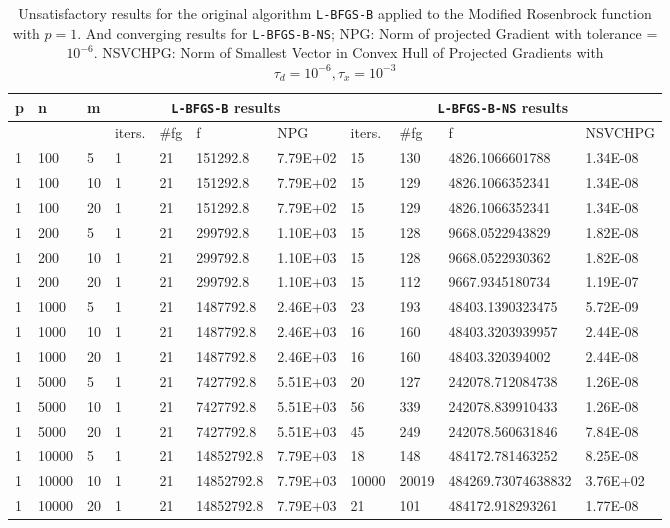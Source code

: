 \begin{table}
  \scriptsize
  \begin{center}
    \begin{tabular}{|l|l|l|l|l|l|l|l|l|l|l|}
      \hline
      p  &  n  &  m  & \multicolumn{4}{|c|}{\texttt{L-BFGS-B} results} & \multicolumn{4}{|c|}{\texttt{L-BFGS-B-NS} results} \\ \hline
      & &  & iters. & \#fg & f & NPG & iters. & \#fg & f & NSVCHPG \\ \hline
      1 & 100 & 5  & 1 & 21 & 151292.8 & 7.79E+02 & 15 & 130 & 4826.1066601788 & 1.34E-08\\
      1 & 100 & 10  & 1 & 21 & 151292.8 & 7.79E+02 & 15 & 129 & 4826.1066352341 & 1.34E-08\\
      1 & 100 & 20  & 1 & 21 & 151292.8 & 7.79E+02 & 15 & 129 & 4826.1066352341 & 1.34E-08\\
      1 & 200 & 5  & 1 & 21 & 299792.8 & 1.10E+03 & 15 & 128 & 9668.0522943829 & 1.82E-08\\
      1 & 200 & 10  & 1 & 21 & 299792.8 & 1.10E+03 & 15 & 128 & 9668.0522930362 & 1.82E-08\\
      1 & 200 & 20  & 1 & 21 & 299792.8 & 1.10E+03 & 15 & 112 & 9667.9345180734 & 1.19E-07\\
      1 & 1000 & 5  & 1 & 21 & 1487792.8 & 2.46E+03 & 23 & 193 & 48403.1390323475 & 5.72E-09\\
      1 & 1000 & 10  & 1 & 21 & 1487792.8 & 2.46E+03 & 16 & 160 & 48403.3203939957 & 2.44E-08\\
      1 & 1000 & 20  & 1 & 21 & 1487792.8 & 2.46E+03 & 16 & 160 & 48403.320394002 & 2.44E-08\\
      1 & 5000 & 5 & 1 & 21 & 7427792.8 & 5.51E+03 & 20 & 127 & 242078.712084738 & 1.26E-08\\
      1 & 5000 & 10 & 1 & 21 & 7427792.8 & 5.51E+03 & 56 & 339 & 242078.839910433 & 1.26E-08\\
      1 & 5000 & 20 & 1 & 21 & 7427792.8 & 5.51E+03 & 45 & 249 & 242078.560631846 & 7.84E-08\\
      1 & 10000 & 5 & 1 & 21 & 14852792.8 & 7.79E+03 & 18 & 148 & 484172.781463252 & 8.25E-08\\
      1 & 10000 & 10 & 1 & 21 & 14852792.8 & 7.79E+03 & 10000 & 20019 & 484269.73074638832 & 3.76E+02 \\
      1 & 10000 & 20 & 1 & 21 & 14852792.8 & 7.79E+03 & 21 & 101 & 484172.918293261 & 1.77E-08\\
      \hline
    \end{tabular}
    \caption[Modified Rosenbrock with $p = 1$]{Unsatisfactory results for the original algorithm \texttt{L-BFGS-B} applied to the Modified Rosenbrock function with $p = 1$. And converging results for \texttt{L-BFGS-B-NS}; NPG: Norm of projected Gradient with tolerance = $10^{-6}$. NSVCHPG: Norm of Smallest Vector in Convex Hull of Projected Gradients with $\tau_d = 10^{-6}, \tau_x = 10^{-3}$}
    \label{pequal1merged}
  \end{center}
\end{table}


